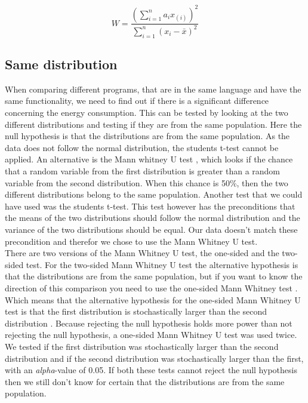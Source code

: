 \begin{equation}
    W = \frac{(\sum_{i=1}^{n} a_{i}x_{(i)})^2}{\sum_{i=1}^{n} (x_{i} - \bar x)^2}
    \label{eq:sw}
\end{equation}


\subsection{Same distribution}
When comparing different programs, that are in the same language and have the same functionality, we need to find out if there is a significant difference concerning the energy consumption. This can be tested by looking at the two different distributions and testing if they are from the same population. Here the null hypothesis is that the distributions are from the same population. As the data does not follow the normal distribution, the students t-test cannot be applied. An alternative is the Mann whitney U test \cite{mann1947test}, which looks if the chance that a random variable from the first distribution is greater than a random variable from the second distribution. When this chance is 50\%, then the two different distributions belong to the same population. Another test that we could have used was the students t-test. This test however has the preconditions that the means of the two distributions should follow the normal distribution and the variance of the two distributions should be equal. Our data doesn't match these precondition and therefor we chose to use the Mann Whitney U test.\\

There are two versions of the Mann Whitney U test, the one-sided and the two-sided test. For the two-sided Mann Whitney U test the alternative hypothesis is that the distributions are from the same population, but if you want to know the direction of this comparison you need to use the one-sided Mann Whitney test \cite{nachar2008mann}. Which means that the alternative hypothesis for the one-sided Mann Whitney U test is that the first distribution is stochastically larger than the second distribution \cite{nachar2008mann}. Because rejecting the null hypothesis holds more power than not rejecting the null hypothesis, a one-sided Mann Whitney U test was used twice. We tested if the first distribution was stochastically larger than the second distribution and if the second distribution was stochastically larger than the first, with an  \textit{alpha}-value of 0.05. If both these tests cannot reject the null hypothesis then we still don't know for certain that the distributions are from the same population.\\

